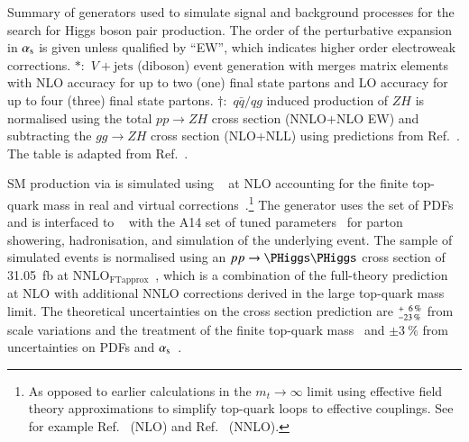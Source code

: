 \begin{sidewaystable}[p]
  \centering

  \caption[Summary of generators used to simulate signal and background
  processes for the search for Higgs boson pair production.]{Summary of
    generators used to simulate signal and background processes for the search
    for Higgs boson pair production. The order of the perturbative expansion in
    $\alpha_{\text{s}}$ is given unless qualified by ``EW'', which indicates higher order
    electroweak corrections. $*$:~$V+\text{jets}$ (diboson) event generation
    with \SHERPA[2.2.1] merges matrix elements with NLO accuracy for up to two
    (one) final state partons and LO accuracy for up to four (three) final state
    partons. $\dagger$:~$q\bar{q} / qg$ induced production of $ZH$ is normalised
    using the total $pp \to ZH$ cross section (NNLO+NLO EW) and subtracting the
    $gg \to ZH$ cross section (NLO+NLL) using predictions from
    Ref.~\cite{deFlorian:2016spz_book}. The table is adapted from
    Ref.~\cite{HDBS-2018-40}.}%
  \label{tab:monte_carlo}

  \resizebox{\textwidth}{!}{}
\end{sidewaystable}

SM \HH production via \ggF is simulated using
\POWHEGBOX[v2]~\cite{Nason:2004rx,Frixione:2007vw,Alioli:2010xd} at NLO
accounting for the finite top-quark mass in real and virtual
corrections~\cite{Borowka:2016ehy,Baglio:2018lrj,Heinrich:2017kxx,Heinrich:2019bkc,Heinrich:2020ckp}.\footnote{As
  opposed to earlier calculations in the $m_{t} \to \infty$ limit using
  effective field theory approximations to simplify top-quark loops to effective
  couplings. See for example Ref.~\cite{Dawson:1998py} (NLO) and
  Ref.~\cite{deFlorian:2013jea} (NNLO).} The generator uses the
\PDFforLHC[15nlo] set of PDFs~\cite{Butterworth:2015oua} and is interfaced to
\PYTHIA[8]~\cite{Sjostrand:2014zea} with the A14 set of tuned
parameters~\cite{ATL-PHYS-PUB-2014-021} for parton showering, hadronisation, and
simulation of the underlying event. The sample of simulated events is normalised
using an $\pp \to \HH$ cross section of \SI{31.05}{\femto\barn} at
$\text{NNLO}_{\text{FTapprox}}$~\cite{Grazzini:2018bsd}, which is a combination
of the full-theory prediction at NLO with additional NNLO corrections derived in
the large top-quark mass limit. The theoretical uncertainties on the cross
section prediction are
$^{\hspace{0.25pt}+\hspace{0.25pt}\phantom{0}6\,\%}_{-23\,\%}$ from scale
variations and the treatment of the finite top-quark mass~\cite{Baglio:2020wgt}
and $\pm\SI{3}{\percent}$ from uncertainties on PDFs and
$\alpha_{\text{s}}$~\cite{LHCHWGHH}.

